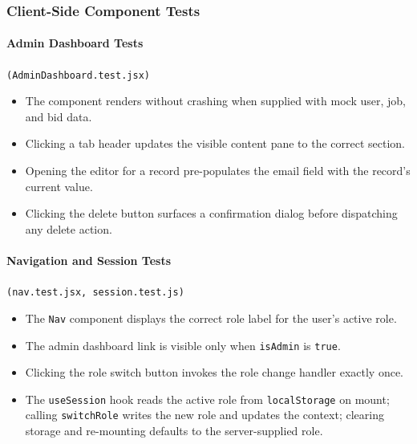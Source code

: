 \documentclass[11pt]{article}
\begin{document}
\subsubsection{Client-Side Component Tests}

\paragraph{Admin Dashboard Tests} \texttt{(AdminDashboard.test.jsx)}
\begin{itemize}[leftmargin=1.4em]
  \item The component renders without crashing when supplied with mock user, job, and bid data.
  \item Clicking a tab header updates the visible content pane to the correct section.
  \item Opening the editor for a record pre-populates the email field with the record's current value.
  \item Clicking the delete button surfaces a confirmation dialog before dispatching any delete action.
\end{itemize}

\paragraph{Navigation and Session Tests} \texttt{(nav.test.jsx, session.test.js)}
\begin{itemize}[leftmargin=1.4em]
  \item The \texttt{Nav} component displays the correct role label for the user's active role.
  \item The admin dashboard link is visible only when \texttt{isAdmin} is \texttt{true}.
  \item Clicking the role switch button invokes the role change handler exactly once.
  \item The \texttt{useSession} hook reads the active role from \texttt{localStorage} on mount; calling \texttt{switchRole} writes the new role and updates the context; clearing storage and re-mounting defaults to the server-supplied role.
\end{itemize}
\end{document}
